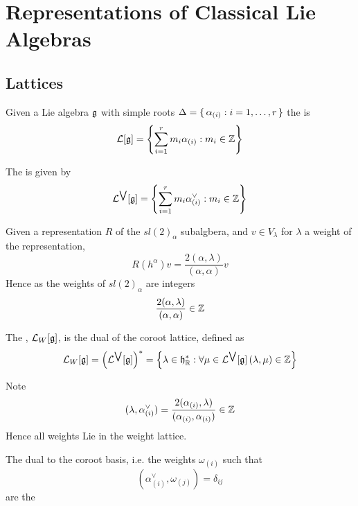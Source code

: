 \documentclass{article}
\begin{document}
\section{Representations of Classical Lie Algebras}
\subsection{Lattices}

\begin{definition}
	Given a Lie algebra $\mathfrak{g}$ with simple roots $\Delta=\set{  \alpha_{(i)} : i=1,\dots,r  }$ the  is 
	\[
	\mathcal{L} [\mathfrak{g}] = \left\{ \sum_{i=1}^r m_i \alpha_{(i)} : m_i \in\mathbb{Z} \right\}
	\]
\end{definition}

\begin{definition}
	The  is given by 
	\[
	\mathcal{L}^{\bigvee} [\mathfrak{g}] =\left\{ \sum_{i=1}^r m_i \alpha^\vee_{(i)} : m_i \in\mathbb{Z} \right\}
	\]
\end{definition}

\begin{definition}
	Given a representation $R$ of the $sl(2)_\alpha$ subalgbera, and $v\in V_\lambda$ for $\lambda$ a weight of the representation,
	\[
	R(h^\alpha)v=\frac{2(\alpha,\lambda)}{(\alpha,\alpha)}v
	\]
	Hence as the weights of $sl(2)_\alpha$ are integers
	\[
	\frac{2(\alpha,\lambda)}{(\alpha,\alpha)} \in \mathbb{Z}
	\]
\end{definition}

\begin{definition}
	The , $\mathcal{L}_W [\mathfrak{g}]$, is the dual of the coroot lattice, defined as 
	\[
	\mathcal{L}_W [\mathfrak{g}] = \left( \mathcal{L}^{\bigvee} [\mathfrak{g}] \right)^\ast = \left\{ \lambda\in\mathfrak{h}^\ast_{\mathbb{R}} : \forall \mu\in\mathcal{L}^{\bigvee} [\mathfrak{g}] \, (\lambda, \mu) \in \mathbb{Z} \right\}
	\]
\end{definition}

\begin{theorem}
	Note 
	\[
	(\lambda, \alpha^\vee_{(i)})=\frac{2(\alpha_{(i)},\lambda)}{(\alpha_{(i)},\alpha_{(i)})} \in \mathbb{Z}
	\]
	Hence all weights Lie in the weight lattice. 
\end{theorem}



\begin{definition}
	The dual to the coroot basis, i.e. the weights $\omega_{(i)}$ such that 
	\[
	(\alpha^\vee_{(i)}, \omega_{(j)})=\delta_{ij}
	\]
	are the 
\end{definition}
\end{document}
